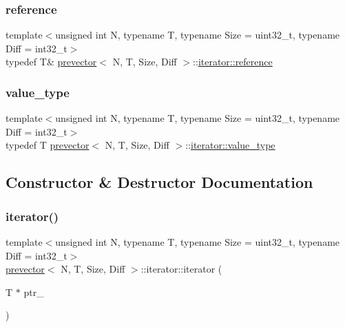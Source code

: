 \mbox{\label{classprevector_1_1iterator_a6341636ac7a5106273407aa3531cb7d4}} 
\subsubsection{\texorpdfstring{reference}{reference}}
{\footnotesize\ttfamily template$<$unsigned int N, typename T, typename Size = uint32\+\_\+t, typename Diff = int32\+\_\+t$>$ \\
typedef T\& \mbox{\hyperlink{classprevector}{prevector}}$<$ N, T, Size, Diff $>$\+::\mbox{\hyperlink{classprevector_1_1iterator_a6341636ac7a5106273407aa3531cb7d4}{iterator\+::reference}}}

\mbox{\label{classprevector_1_1iterator_a4ed27e1ffe40f9402eafa1b25d52acc6}} 
\subsubsection{\texorpdfstring{value\+\_\+type}{value\_type}}
{\footnotesize\ttfamily template$<$unsigned int N, typename T, typename Size = uint32\+\_\+t, typename Diff = int32\+\_\+t$>$ \\
typedef T \mbox{\hyperlink{classprevector}{prevector}}$<$ N, T, Size, Diff $>$\+::\mbox{\hyperlink{classprevector_1_1iterator_a4ed27e1ffe40f9402eafa1b25d52acc6}{iterator\+::value\+\_\+type}}}



\subsection{Constructor \& Destructor Documentation}
\mbox{\label{classprevector_1_1iterator_ae9dd2b5e8d96f866e4b05d6b7535f285}} 
\subsubsection{\texorpdfstring{iterator()}{iterator()}}
{\footnotesize\ttfamily template$<$unsigned int N, typename T, typename Size = uint32\+\_\+t, typename Diff = int32\+\_\+t$>$ \\
\mbox{\hyperlink{classprevector}{prevector}}$<$ N, T, Size, Diff $>$\+::iterator\+::iterator (\begin{DoxyParamCaption}\item[{T $\ast$}]{ptr\+\_\+ }\end{DoxyParamCaption})\hspace{0.3cm}{\ttfamily [inline]}}



